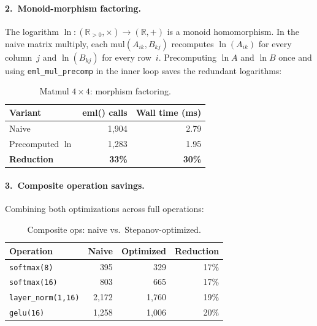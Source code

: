 \documentclass[acmsmall,nonacm]{acmart}
\begin{document}
\paragraph{2.\ Monoid-morphism factoring.}
The logarithm $\ln\colon(\mathbb{R}_{>0}, \times) \to (\mathbb{R}, +)$
is a monoid homomorphism.  In the naive matrix multiply, each
$\mathrm{mul}(A_{ik}, B_{kj})$ recomputes $\ln(A_{ik})$ for every
column~$j$ and $\ln(B_{kj})$ for every row~$i$.  Precomputing
$\ln A$ and $\ln B$ once and using \texttt{eml\_mul\_precomp} in the
inner loop saves the redundant logarithms:

\begin{table}[h]
\caption{Matmul $4{\times}4$: morphism factoring.}
\label{tab:matmul-factor}
\centering
\begin{tabular}{lrr}
\toprule
\textbf{Variant} & \textbf{eml() calls} & \textbf{Wall time (ms)} \\
\midrule
Naive             & 1,904  & 2.79 \\
Precomputed $\ln$ & 1,283  & 1.95 \\
\midrule
\textbf{Reduction} & \textbf{33\%} & \textbf{30\%} \\
\bottomrule
\end{tabular}
\end{table}

\paragraph{3.\ Composite operation savings.}
Combining both optimizations across full operations:

\begin{table}[h]
\caption{Composite ops: naive vs.\ Stepanov-optimized.}
\label{tab:composite}
\centering
\begin{tabular}{lrrr}
\toprule
\textbf{Operation} & \textbf{Naive} & \textbf{Optimized} & \textbf{Reduction} \\
\midrule
\texttt{softmax(8)}       & 395   & 329   & 17\% \\
\texttt{softmax(16)}      & 803   & 665   & 17\% \\
\texttt{layer\_norm(1,16)} & 2,172 & 1,760 & 19\% \\
\texttt{gelu(16)}          & 1,258 & 1,006 & 20\% \\
\bottomrule
\end{tabular}
\end{table}


\end{document}
